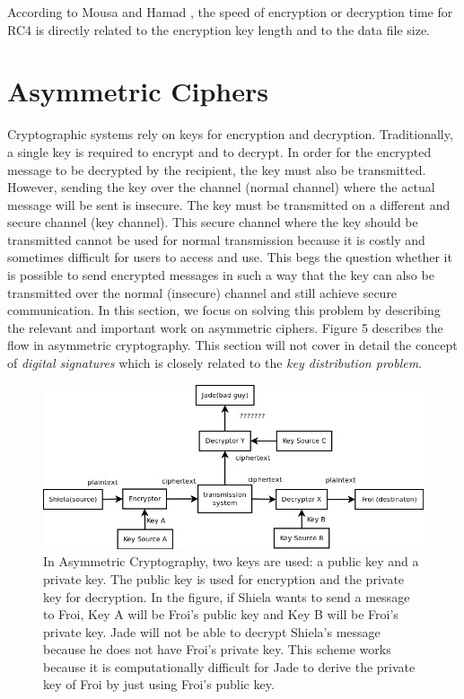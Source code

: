 \documentclass{article}
\begin{document}
According to Mousa and Hamad \cite{mousa2006}, the speed of encryption or decryption time for RC4 is directly related to the encryption key length and to the data file size.

\section{Asymmetric Ciphers}

Cryptographic systems rely on keys for encryption and decryption.
Traditionally, a single key is required to encrypt and to decrypt.
In order for the encrypted message to be decrypted
by the recipient, the key must also be transmitted. However, sending
the key over the channel (normal channel) where the actual message
will be sent is insecure. The key must be transmitted on a different
and secure channel (key channel)\cite{merkle_secure_1978}. This secure
channel where the key should be transmitted cannot be used for normal
transmission because it is costly and sometimes difficult for users
to access and use\cite{merkle_secure_1978}. This begs the question
whether it is possible to send encrypted messages in such a way that
the key can also be transmitted over the normal (insecure) channel
and still achieve secure communication. In this section, we focus
on solving this problem by describing the relevant and important work
on asymmetric ciphers. Figure 5 describes the flow in asymmetric cryptography.
This section will not cover in detail the concept of \textit{digital
signatures} which is closely related to the \textit{key distribution
problem}.

\begin{figure}[h]
\includegraphics[scale=0.6]{flowchart1}

\caption{In Asymmetric Cryptography, two keys are used: a public key and a
private key. The public key is used for encryption and the private
key for decryption. In the figure, if Shiela wants to send a message
to Froi, Key A will be Froi\textquoteright{}s public key and Key B
will be Froi\textquoteright{}s private key. Jade will not be able
to decrypt Shiela\textquoteright{}s message because he does not have
Froi\textquoteright{}s private key. This scheme works because it is
computationally difficult for Jade to derive the private key of Froi
by just using Froi\textquoteright{}s public key.}
\end{figure}
\end{document}
